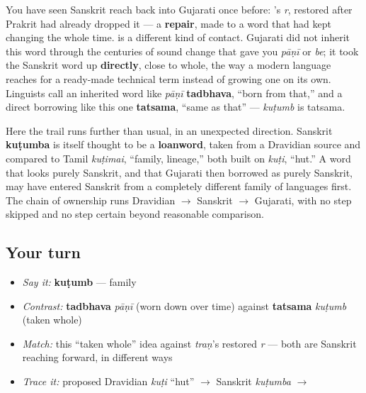 \begin{grammarlens}[title={Grammar Lens: taken whole, not worn down}]
You have seen Sanskrit reach back into Gujarati once before: \textbf{}'s \emph{r}, restored after Prakrit had already dropped it — a \textbf{repair}, made to a word that had kept changing the whole time. \textbf{} is a different kind of contact. Gujarati did not inherit this word through the centuries of sound change that gave you \emph{pāṇī} or \emph{be}; it took the Sanskrit word up \textbf{directly}, close to whole, the way a modern language reaches for a ready-made technical term instead of growing one on its own. Linguists call an inherited word like \emph{pāṇī} \textbf{tadbhava}, \textquotedblleft{}born from that,\textquotedblright{} and a direct borrowing like this one \textbf{tatsama}, \textquotedblleft{}same as that\textquotedblright{} — \emph{kuṭumb} is tatsama.
\end{grammarlens}

\begin{cousinweb}
Here the trail runs further than usual, in an unexpected direction. Sanskrit \textbf{kuṭumba} is itself thought to be a \textbf{loanword}, taken from a Dravidian source and compared to Tamil \emph{kuṭimai}, \textquotedblleft{}family, lineage,\textquotedblright{} both built on \emph{kuṭi}, \textquotedblleft{}hut.\textquotedblright{} A word that looks purely Sanskrit, and that Gujarati then borrowed as purely Sanskrit, may have entered Sanskrit from a completely different family of languages first. The chain of ownership runs Dravidian $\to$ Sanskrit $\to$ Gujarati, with no step skipped and no step certain beyond reasonable comparison.
\end{cousinweb}

\subsection*{Your turn}
\begin{itemize}
\raggedright
  \item \emph{Say it:} \textbf{kuṭumb} — family
  \item \emph{Contrast:} \textbf{tadbhava} \emph{pāṇī} (worn down over time) against \textbf{tatsama} \emph{kuṭumb} (taken whole)
  \item \emph{Match:} this \textquotedblleft{}taken whole\textquotedblright{} idea against \emph{traṇ}'s restored \emph{r} — both are Sanskrit reaching forward, in different ways
  \item \emph{Trace it:} proposed Dravidian \emph{kuṭi} \textquotedblleft{}hut\textquotedblright{} $\to$ Sanskrit \emph{kuṭumba} $\to$ \textbf{}
\end{itemize}

